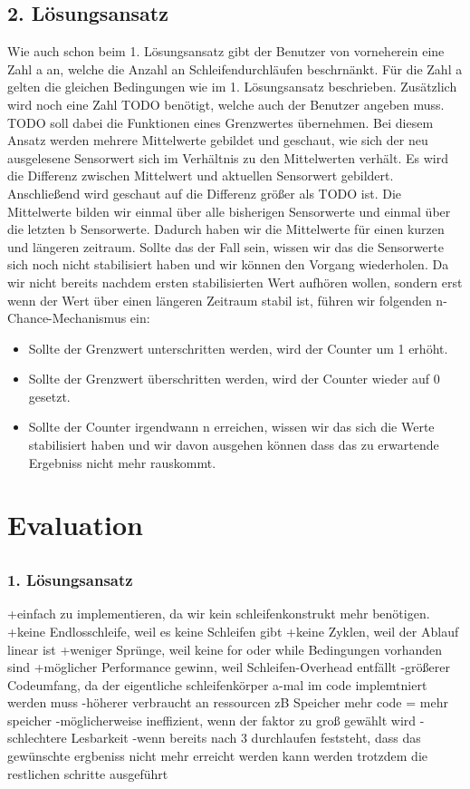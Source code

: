 \documentclass{article}
\begin{document}
    \subsection{2. Lösungsansatz}
    Wie auch schon beim 1. Lösungsansatz gibt der Benutzer von vorneherein eine Zahl a an, welche die Anzahl an Schleifendurchläufen beschrnänkt. Für die Zahl a gelten die gleichen Bedingungen wie im 1. Lösungsansatz beschrieben. 
    Zusätzlich wird noch eine Zahl TODO benötigt, welche auch der Benutzer angeben muss. TODO soll dabei die Funktionen eines Grenzwertes übernehmen.
    Bei diesem Ansatz werden mehrere Mittelwerte gebildet und geschaut, wie sich der neu ausgelesene Sensorwert sich im Verhältnis zu den Mittelwerten verhält. Es wird die Differenz zwischen Mittelwert und aktuellen Sensorwert gebildert. Anschließend wird geschaut auf die Differenz größer als TODO ist.
    Die Mittelwerte bilden wir einmal über alle bisherigen Sensorwerte und einmal über die letzten b Sensorwerte. Dadurch haben wir die Mittelwerte für einen kurzen und längeren zeitraum.
    Sollte das der Fall sein, wissen wir das die Sensorwerte sich noch nicht stabilisiert haben und wir können den Vorgang wiederholen. Da wir nicht bereits nachdem ersten stabilisierten Wert aufhören wollen, sondern erst wenn der Wert über einen längeren Zeitraum stabil ist, führen wir folgenden n-Chance-Mechanismus ein:
    \begin{itemize}
        \item Sollte der Grenzwert unterschritten werden, wird der Counter um 1 erhöht.
        \item Sollte der Grenzwert überschritten werden, wird der Counter wieder auf 0 gesetzt.
        \item Sollte der Counter irgendwann n erreichen, wissen wir das sich die Werte stabilisiert haben und wir davon ausgehen können dass das zu erwartende Ergebniss nicht mehr rauskommt.
    \end{itemize}
    \newpage
    \section{Evaluation}
    \label{Evaluation}
    \subsection{}
    \subsubsection{1. Lösungsansatz}
    +einfach zu implementieren, da wir kein schleifenkonstrukt mehr benötigen.
    +keine Endlosschleife, weil es keine Schleifen gibt
    +keine Zyklen, weil der Ablauf linear ist
    +weniger Sprünge, weil keine for oder while Bedingungen vorhanden sind
    +möglicher Performance gewinn, weil Schleifen-Overhead entfällt
    -größerer Codeumfang, da der eigentliche schleifenkörper a-mal im code implemtniert werden muss 
    -höherer verbraucht an ressourcen zB Speicher mehr code = mehr speicher
    -möglicherweise ineffizient, wenn der faktor zu groß gewählt wird
    -schlechtere Lesbarkeit
    -wenn bereits nach 3 durchlaufen feststeht, dass das gewünschte ergbeniss nicht mehr erreicht werden kann werden trotzdem die restlichen schritte ausgeführt
\end{document}

